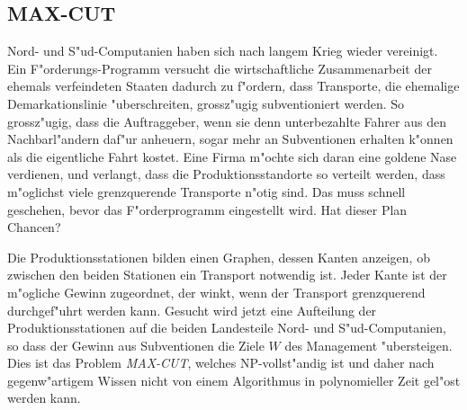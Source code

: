 \subsection{MAX-CUT}
Nord- und S"ud-Computanien haben sich nach langem Krieg wieder
vereinigt. Ein F"orderungs-Programm versucht die wirtschaftliche
Zusammenarbeit der ehemals verfeindeten Staaten dadurch zu f"ordern,
dass Transporte, die ehemalige Demarkationslinie "uberschreiten,
grossz"ugig subventioniert werden. So grossz"ugig, dass die
Auftraggeber, wenn sie denn unterbezahlte Fahrer aus den Nachbarl"andern
daf"ur anheuern, sogar mehr an Subventionen erhalten k"onnen als
die eigentliche Fahrt kostet. Eine Firma m"ochte sich daran eine
goldene Nase verdienen, und verlangt, dass die Produktionsstandorte so verteilt
werden, dass m"oglichst viele grenzquerende Transporte n"otig sind.
Das muss schnell geschehen, bevor das F"orderprogramm eingestellt wird.
Hat dieser Plan Chancen?

\medskip

Die Produktionsstationen bilden einen Graphen, dessen Kanten
anzeigen, ob zwischen den beiden Stationen ein Transport notwendig
ist. Jeder Kante ist der m"ogliche Gewinn zugeordnet, der winkt,
wenn der Transport grenzquerend durchgef"uhrt werden kann. Gesucht
wird jetzt eine Aufteilung der Produktionsstationen auf die
beiden Landesteile Nord- und S"ud-Computanien, so dass der Gewinn
aus Subventionen die Ziele $W$ des Management "ubersteigen.
Dies ist das Problem {\it MAX-CUT}, welches NP-vollst"andig ist
und daher nach gegenw"artigem Wissen nicht von einem Algorithmus
in polynomieller Zeit gel"ost werden kann.
